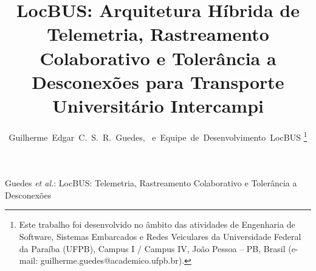 \documentclass[lettersize,journal]{IEEEtran}
\begin{document}
\title{LocBUS: Arquitetura Híbrida de Telemetria, Rastreamento Colaborativo e Tolerância a Desconexões para Transporte Universitário Intercampi}

\author{Guilherme~Edgar~C.~S.~R.~Guedes,~
        e~Equipe~de~Desenvolvimento~LocBUS
\thanks{Este trabalho foi desenvolvido no âmbito das atividades de Engenharia de Software, Sistemas Embarcados e Redes Veiculares da Universidade Federal da Paraíba (UFPB), Campus I / Campus IV, João Pessoa -- PB, Brasil (e-mail: guilherme.guedes@academico.ufpb.br).}}

%
{Guedes \MakeLowercase{\textit{et al.}}: LocBUS: Telemetria, Rastreamento Colaborativo e Tolerância a Desconexões}

\maketitle
\end{document}
